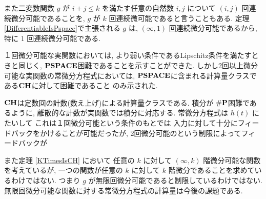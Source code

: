 また二変数関数 $g$ が
$i+j \le k$ を満たす任意の自然数 $i,j$ について
$(i,j)$ 回連続微分可能であることを, 
$g$ が $k$ 回連続微可能であると言うこともある.
定理\ref{DifferentiableIsPspace}で主張される $g$ は, 
$(\infty, 1)$ 回連続微分可能であるから, 
特に $1$ 回連続微分可能である. 


１回微分可能な実関数においては, より弱い条件であるLipschitz条件を満たすときと同じく,
$\mathbf{PSPACE}$困難であることを示すことができた.
しかし2回以上微分可能な実関数の常微分方程式においては,
$\mathbf{PSPACE}$に含まれる計算量クラスである$\mathbf{CH}$に対して困難であること
のみ示された.

$\mathbf{CH}$は定数回の計数(数え上げ)による計算量クラスである.
積分が $\#\mathbf{P}$困難であるように,
離散的な計数が実関数では積分に対応する.
常微分方程式は $h(t)$ にたいして
これは１回微分可能という条件のもとでは
入力に対して十分にフィードバックをかけることが可能だったが,
2回微分可能のという制限によってフィードバックが



 また定理 \ref{KTimesIsCH} において
 任意の $k$ に対して $(\infty, k)$ 階微分可能な関数を考えているが,
 一つの関数が任意の $k$ に対して $k$ 階微分であることを求めているわけではない.
 つまり $g$ が無限回微分可能であると制限しているわけではない. 
 無限回微分可能な関数に対する常微分方程式の計算量は今後の課題である.

